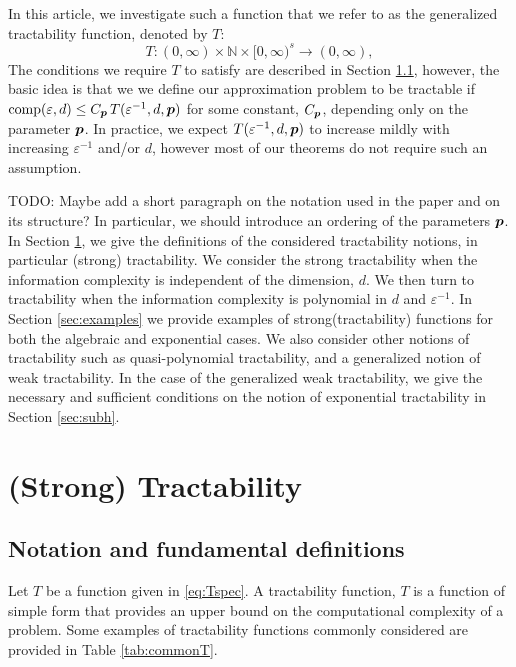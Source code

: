 \documentclass[11pt,a4paper]{article}
\newcommand{\peter}[1]{\begingroup\color{purple}#1\endgroup}
\newcommand{\kachi}[1]{\begingroup\color{ForestGreen}#1\endgroup}
\begin{document}
In this article, we investigate such a function that we refer to as the generalized tractability function, denoted by $T$:
\begin{equation} \label{eq:Tspec}
    T :(0,\infty) \times \mathbb{N} \times [0,\infty)^s \rightarrow (0,\infty),
\end{equation}
The conditions we require $T$ to satisfy are described in  Section \ref{sec:not}, however, the basic idea is that we we define our approximation problem to be tractable if 
$\operatorname{comp}(\varepsilon, d) \le  C_{\boldsymbol{p}}\, T(\varepsilon^{-1},d,\boldsymbol{p})$ for some constant, $C_{\boldsymbol{p}}$, depending only on the parameter $\boldsymbol{p}$.  In practice, we expect $T(\varepsilon^{-1},d,\boldsymbol{p})$ to increase mildly with increasing $\varepsilon^{-1}$ and/or $d$, however most of our theorems do not require such an assumption.


\peter{TODO: Maybe add a short paragraph on the notation used in the paper and on its structure? In particular, we should introduce
an ordering of the parameters $\boldsymbol{p}$.}\\


In Section \ref{sec:spt}, we give the definitions of the considered tractability notions, in particular (strong) tractability. We consider the strong tractability when the information complexity is independent of the dimension, $d$. We then turn to tractability  when the information complexity is polynomial in $d$ and $\varepsilon^{-1}$. In Section \ref{sec:examples} we provide examples of strong(tractability) functions for both the algebraic and exponential cases. We also consider other notions of tractability such as quasi-polynomial tractability, and a generalized notion of weak tractability. In the case of the generalized weak tractability, we give the necessary and sufficient conditions on the notion of exponential tractability in Section \ref{sec:subh}. 

\section{(Strong) Tractability}\label{sec:spt}

\subsection{Notation and fundamental definitions} \label{sec:not}
Let $T$ be a function given in \eqref{eq:Tspec}.
A tractability function, $T$ is a function of simple form that provides an upper bound on the computational complexity of a problem.  Some examples of tractability functions commonly considered are provided in Table \ref{tab:commonT}.
\end{document}
